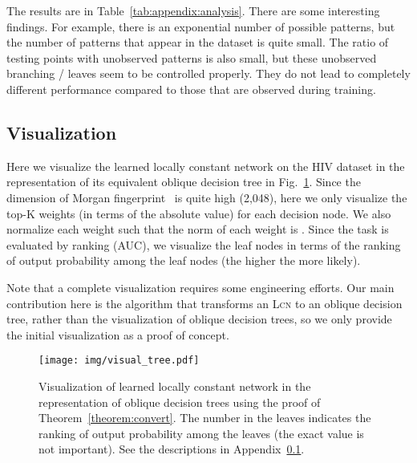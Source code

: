 \documentclass{article} \usepackage{iclr2020_conference,times}
\begin{document}
The results are in Table~\ref{tab:appendix:analysis}. There are some interesting findings. For example, there is an exponential number of possible patterns, but the number of patterns that appear in the dataset is quite small. The ratio of testing points with unobserved patterns is also small, but these unobserved branching / leaves seem to be controlled properly. They do not lead to completely different performance compared to those that are observed during training. 

\subsection{Visualization}\label{appendix:visualization}

Here we visualize the learned locally constant network on the HIV dataset in the representation of its equivalent oblique decision tree in Fig.~\ref{fig:visualization}. Since the dimension of Morgan fingerprint~\citep{rogers2010extended} is quite high (2,048), here we only visualize the top-K weights (in terms of the absolute value) for each decision node. We also normalize each weight such that the  norm of each weight is . Since the task is evaluated by ranking (AUC), we visualize the leaf nodes in terms of the ranking of output probability among the leaf nodes (the higher the more likely). 


Note that a complete visualization requires some engineering efforts. Our main contribution here is the algorithm that transforms an \textsc{Lcn} to an oblique decision tree, rather than the visualization of oblique decision trees, so we only provide the initial visualization as a proof of concept. 



\begin{figure}
\vspace{-1mm}
	\centering
	\texttt{[image: img/visual\_tree.pdf]}
	\caption{Visualization of learned locally constant network in the representation of oblique decision trees using the proof of Theorem~\ref{theorem:convert}. The number in the leaves indicates the ranking of output probability among the  leaves (the exact value is not important). See the descriptions in Appendix~\ref{appendix:visualization}.}\label{fig:visualization}
    \vspace{-2.5mm}
\end{figure}
 
\end{document}
